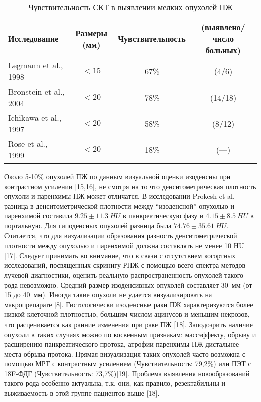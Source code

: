 \begin{table}[htbp]
        \caption{Чувствительность СКТ в выявлении мелких опухолей ПЖ}
        \begin{flushleft}
        \begin{tabular}{|p{6cm}|c|c|c|}
        \hline
        Исследование & Размеры (мм) & Чувствительность & (выявлено/число больных)\\ \hline
        Legmann et al., 1998 & $<15$ & 67\% & (4/6) \\ \hline
        Bronstein et al., 2004 & $<20$ &  78\% & (14/18) \\ \hline
        Ichikawa et al., 1997 & $<20$ &  58\% & (8/12) \\ \hline
        Rose et al., 1999 & $<20$ &  18\% & (---) \\ \hline
        \end{tabular}
        \end{flushleft}
        \label{ct_sensitivity}
\end{table}

Около 5-10\% опухолей ПЖ по данным визуальной оценки изоденсны при контрастном усилении [15,16], не смотря на то что денситометрическая плотность опухоли и паренхимы ПЖ может отличатся. В исследовании Prokesh et al. разница в денситометрической плотности между “изоденсной” опухолью и паренхимой составила $9.25\pm11.3~HU$ в панкреатическую фазу и $4.15\pm8.5~HU$ в портальную. Для гиподенсных опухолей разница была $74.76\pm35.61~HU$. Считается, что для визуализации образования разность денситометрической плотности между опухолью и паренхимой должна составлять не менее 10 HU [17]. Следует принимать во внимание, что в связи с отсутствием когортных исследований, посвященных скринигу РПЖ с помощью всего спектра методов лучевой диагностики, оценить реальную распространенность опухолей такого рода невозможно. Средний размер изоденсивных опухолей составляет 30~мм (от 15 до 40~мм). Иногда такие опухоли не удается визуализировать на макропрепарате [8]. Гистологически изоденсные раки ПЖ характеризуются более низкой клеточной плотностью, большим числом ацинусов и меньшим некрозов, что расценивается как ранние изменения при раке ПЖ [18]. Заподозрить наличие опухоли в таких случаях можно по косвенным признакам: массэффекту, обрыву и расширению панкреатического протока, атрофии паренхимы ПЖ дистальнее места обрыва протока. Прямая визуализация таких опухолей часто возможна с помощью МРТ с контрастным усилением (Чувствительность: 79,2\%) или ПЭТ с 18F-ФДГ (Чувствительность: 73,7\%)[19]. Проблема выявления новообразований такого рода особенно актуальна, т.к. они, как правило, резектабильны и выживаемость в этой группе пациентов выше [18].
